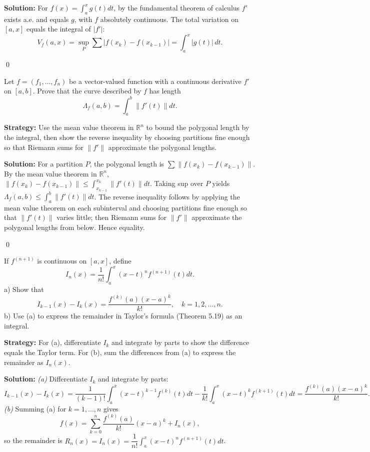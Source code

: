 \bigskip\noindent\textbf{Solution:}
For $f(x)=\int_a^x g(t)dt$, by the fundamental theorem of calculus $f'$ exists a.e. and equals $g$, with $f$ absolutely continuous. The total variation on $[a,x]$ equals the integral of $|f'|$:
\[V_f(a,x)=\sup_{P}\sum|f(x_k)-f(x_{k-1})|=\int_a^x |g(t)|\,dt.
\]




\qed
\begin{problembox}
Let $f = (f_1, \ldots, f_n)$ be a vector-valued function with a continuous derivative $f'$ on $[a, b]$. Prove that the curve described by $f$ has length 
\[\Lambda_f(a, b) = \int_a^b \|f'(t)\| dt.\]
\end{problembox}

\noindent\textbf{Strategy:} Use the mean value theorem in $\mathbb{R}^n$ to bound the polygonal length by the integral, then show the reverse inequality by choosing partitions fine enough so that Riemann sums for $\|f'\|$ approximate the polygonal lengths.

\bigskip\noindent\textbf{Solution:}
For a partition $P$, the polygonal length is $\sum\|f(x_k)-f(x_{k-1})\|$. By the mean value theorem in $\mathbb{R}^n$, $\|f(x_k)-f(x_{k-1})\|\le \int_{x_{k-1}}^{x_k}\|f'(t)\|dt$. Taking sup over $P$ yields $\Lambda_f(a,b)\le\int_a^b\|f'(t)\|dt$. The reverse inequality follows by applying the mean value theorem on each subinterval and choosing partitions fine enough so that $\|f'(t)\|$ varies little; then Riemann sums for $\|f'\|$ approximate the polygonal lengths from below. Hence equality.




\qed
\begin{problembox}
If $f^{(n+1)}$ is continuous on $[a, x]$, define 
\[I_n(x) = \frac{1}{n!} \int_a^x (x - t)^n f^{(n+1)}(t) dt.\]
a) Show that 
\[I_{k-1}(x) - I_k(x) = \frac{f^{(k)}(a)(x - a)^k}{k!}, \quad k = 1, 2, \ldots, n.\]
b) Use (a) to express the remainder in Taylor's formula (Theorem 5.19) as an integral.
\end{problembox}

\noindent\textbf{Strategy:} For (a), differentiate $I_k$ and integrate by parts to show the difference equals the Taylor term. For (b), sum the differences from (a) to express the remainder as $I_n(x)$.

\bigskip\noindent\textbf{Solution:}
\textit{(a)} Differentiate $I_k$ and integrate by parts:
\[I_{k-1}(x)-I_k(x)=\frac{1}{(k-1)!}\int_a^x (x-t)^{k-1} f^{(k)}(t)dt-\frac{1}{k!}\int_a^x (x-t)^k f^{(k+1)}(t)dt=\frac{f^{(k)}(a)(x-a)^k}{k!}.
\]
\textit{(b)} Summing (a) for $k=1,\dots,n$ gives
\[f(x)=\sum_{k=0}^n \frac{f^{(k)}(a)}{k!}(x-a)^k+I_n(x),\]
so the remainder is $R_n(x)=I_n(x)=\dfrac{1}{n!}\int_a^x (x-t)^n f^{(n+1)}(t)dt$.




